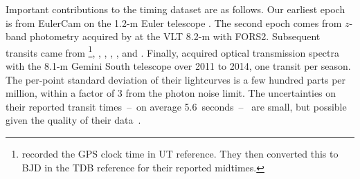 \documentclass[12pt,twocolumn,tighten]{aastex62}
\begin{document}
Important contributions to the timing dataset are as follows.  Our
earliest epoch is from EulerCam on the 1.2-m Euler telescope
\citep{wilson_wasp-4b_2008}.  The second epoch comes from $z$-band
photometry acquired by \citet{gillon_improved_2009} at the VLT 8.2-m
with FORS2.  Subsequent transits came from
\citet{winn_transit_2009}\footnote{\citet{winn_transit_2009} recorded
the GPS clock time in UT reference. They then converted this to BJD in
the TDB reference for their reported midtimes.},
\citet{dragomir_terms_2011}, \citet{sanchis-ojeda_starspots_2011},
\citet{nikolov_wasp-4b_2012}, \citet{hoyer_tramos_2013}, and
\citet{ranjan_atmospheric_2014}.  Finally, \citet{huitson_gemini_2017}
acquired optical transmission spectra with the 8.1-m Gemini South
telescope over 2011 to 2014, one transit per season.  The per-point
standard deviation of their lightcurves is a few hundred parts per
million, within a factor of 3 from the photon noise limit.  The
uncertainties on their reported transit times~--~on average
5.6~seconds~--~ are small, but possible given the quality of their
data~\citep{carter_analytic_2008}.

\end{document}
